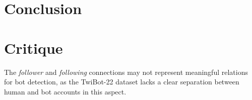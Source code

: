 \documentclass[12pt, a4paper]{article}
\begin{document}
\section{Conclusion}
	\label{conclusion}
    

\section{Critique}
	\label{critique}
	The \textit{follower} and \textit{following} connections may not represent meaningful relations for bot detection, as the TwiBot-22 dataset lacks a clear separation between human and bot accounts in this aspect.


\newpage


\end{document}
